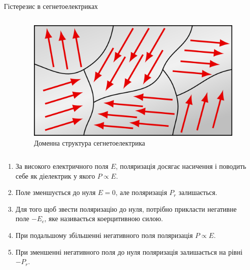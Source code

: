 \documentclass[onlytextwidth]{beamer}
\begin{document}
\begin{frame}{Гістерезис в сегнетоелектриках}{}
\begin{columns}
\begin{column}{0.5\linewidth}
		\end{column}
		\begin{column}{0.5\linewidth}
			\begin{figure}
				\includegraphics[width=0.5\linewidth]{domains}
				\caption{\centering\scriptsize Доменна структура сегнетоелектрика}
			\end{figure}
		\end{column}
	\end{columns}
	\begin{enumerate}\justifying\small
		\item За високого електричного поля $ E $, поляризація досягає насичення і поводить себе як
		      діелектрик у якого $P \propto E$.
		\item  Поле зменшується до нуля $E = 0$, але поляризація $ P_r $ залишається.
		\item Для того щоб звести поляризацію до нуля, потрібно прикласти негативне поле $-E_c$,
		      яке називається \alert{коерцитивною силою}.
		\item При подальшому збільшенні негативного поля поляризація $P \propto E$.
		\item  При зменшенні негативного поля до нуля поляризація залишається на рівні $ -P_r $.
	\end{enumerate}
\end{frame}
\end{document}
